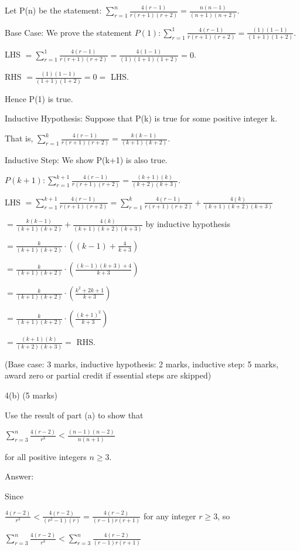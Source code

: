 \documentclass[a4paper,12pt,oneside]{book}
\theoremstyle{definition}
\begin{document}
Let P(n) be the statement: $\sum_{r=1}^n \frac{4(r-1)}{r(r+1)(r+2)} = \frac{n(n-1)}{(n+1)(n+2)}$.

Base Case: We prove the statement $P(1) : \sum_{r=1}^1 \frac{4(r-1)}{r(r+1)(r+2)} = \frac{(1)(1-1)}{(1+1)(1+2)}$.

LHS $ =\sum_{r=1}^1 \frac{4(r-1)}{r(r+1)(r+2)} = \frac{4(1-1)}{(1)(1+1)(1+2)} = 0$.

RHS $ = \frac{(1)(1-1)}{(1+1)(1+2)} = 0 = $ LHS.

Hence P(1) is true.

Inductive Hypothesis: Suppose that P(k) is true for some positive integer k.

That is, $\sum_{r=1}^k \frac{4(r-1)}{r(r+1)(r+2)} = \frac{k(k-1)}{(k+1)(k+2)}$.

Inductive Step: We show P(k+1)  is also true.

$P(k+1) : \sum_{r=1}^{k+1} \frac{4(r-1)}{r(r+1)(r+2)} = \frac{(k+1)(k)}{(k+2)(k+3)}$.

LHS $ = \sum_{r=1}^{k+1} \frac{4(r-1)}{r(r+1)(r+2)}  = \sum_{r=1}^{k} \frac{4(r-1)}{r(r+1)(r+2)} + \frac{4(k)}{(k+1)(k+2)(k+3)}$

$= \frac{k(k-1)}{(k+1)(k+2)} + \frac{4(k)}{(k+1)(k+2)(k+3)}$ by inductive hypothesis

$= \frac{k}{(k+1)(k+2)} \cdot \left( (k-1) + \frac{4}{k+3} \right)$

$= \frac{k}{(k+1)(k+2)} \cdot \left( \frac{(k-1)(k+3)+4}{k+3} \right)$

$= \frac{k}{(k+1)(k+2)} \cdot \left( \frac{k^2+2k+1}{k+3} \right)$

$= \frac{k}{(k+1)(k+2)} \cdot \left( \frac{(k+1)^2}{k+3} \right)$

$= \frac{(k+1)(k)}{(k+2)(k+3)} = $ RHS.

(Base case: 3 marks, inductive hypothesis: 2 marks, inductive step: 5 marks, award zero or partial credit if essential steps are skipped)

4(b) (5 marks) 

Use the result of part (a) to show that

$\sum_{r=3}^n \frac{4(r-2)}{r^3} < \frac{(n-1)(n-2)}{n(n+1)}$

for all positive integers $n \geq 3$.

Answer:

Since 

$\frac{4(r-2)}{r^3} < \frac{4(r-2)}{(r^2-1)(r)} = \frac{4(r-2)}{(r-1)r(r+1)}$ for any integer $r \geq 3$, so

$\sum_{r=3}^n \frac{4(r-2)}{r^3} < \sum_{r=3}^n \frac{4(r-2)}{(r-1)r(r+1)}$
\end{document}
